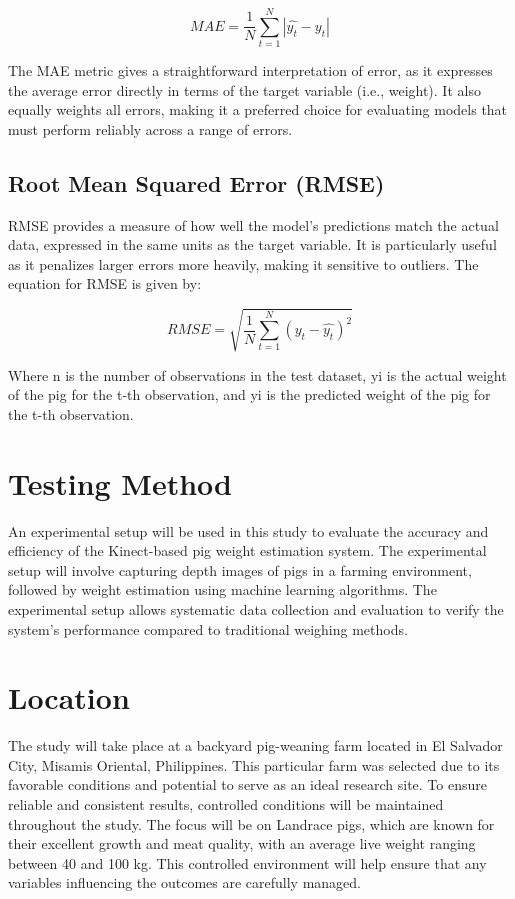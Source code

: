 {\myequation{}
\begin{equation}
	MAE = \frac{1}{N} \sum_{t=1}^{N} \left| \hat{y_t} - y_t \right|
\end{equation}

The MAE metric gives a straightforward interpretation of error, as it expresses the average error directly in terms of the target variable (i.e., weight). It also equally weights all errors, making it a preferred choice for evaluating models that must perform reliably across a range of errors.

\subsection{Root Mean Squared Error (RMSE)}
RMSE provides a measure of how well the model's predictions match the actual data, expressed in the same units as the target variable. It is particularly useful as it penalizes larger errors more heavily, making it sensitive to outliers. The equation for RMSE is given by:

\myequation{}
\begin{equation}
	RMSE = \sqrt{\frac{1}{N} \sum_{t=1}^{N} \left( y_t - \hat{y_t} \right)^2}
\end{equation}

Where n is the number of observations in the test dataset, yi is the actual weight of the pig for the t-th observation, and yi is the predicted weight of the pig for the t-th observation.

\section{Testing Method}
An experimental setup will be used in this study to evaluate the accuracy and efficiency of the Kinect-based pig weight estimation system. The experimental setup will involve capturing depth images of pigs in a farming environment, followed by weight estimation using machine learning algorithms. The experimental setup allows systematic data collection and evaluation to verify the system’s performance compared to traditional weighing methods.

\section{Location}
The study will take place at a backyard pig-weaning farm located in El Salvador City, Misamis Oriental, Philippines. This particular farm was selected due to its favorable conditions and potential to serve as an ideal research site. To ensure reliable and consistent results, controlled conditions will be maintained throughout the study. The focus will be on Landrace pigs, which are known for their excellent growth and meat quality, with an average live weight ranging between 40 and 100 kg. This controlled environment will help ensure that any variables influencing the outcomes are carefully managed.

}

